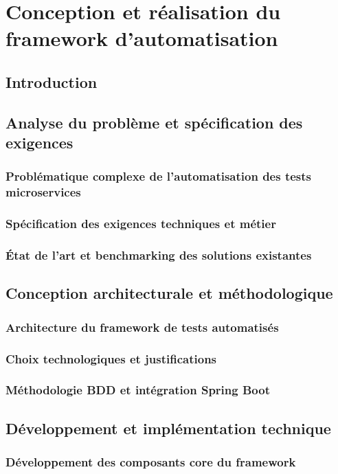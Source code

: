 \chapter{Conception et réalisation du framework d'automatisation}

\section{Introduction}

\section{Analyse du problème et spécification des exigences}
\subsection{Problématique complexe de l'automatisation des tests microservices}
\subsection{Spécification des exigences techniques et métier}
\subsection{État de l'art et benchmarking des solutions existantes}

\section{Conception architecturale et méthodologique}
\subsection{Architecture du framework de tests automatisés}
\subsection{Choix technologiques et justifications}
\subsection{Méthodologie BDD et intégration Spring Boot}

\section{Développement et implémentation technique}
\subsection{Développement des composants core du framework}
